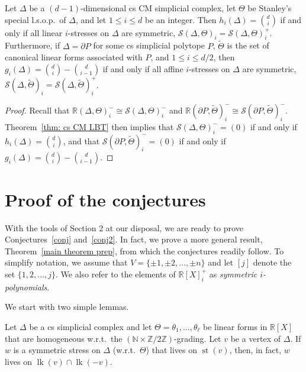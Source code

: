 \documentclass[ALCO,ThmDefs,Unicode,epreuves]{cedram}
\DeclareMathOperator{\lk}{lk}
\DeclareMathOperator{\st}{st}
\newcommand{\N}{\mathbb{N}}
\newcommand{\R}{\mathbb{R}{}}
\newcommand{\Z}{{\mathbb Z}}
\newcommand{\Stress}{\mathcal{S}}
\begin{document}
\begin{coro}\label{cor: minimal h_2 -> symmetry}
	Let $\Delta$ be a $(d-1)$-dimensional cs CM simplicial complex, let $\Theta$ be Stanley's special l.s.o.p.~of $\Delta$, and let $1\leq i\leq d$ be an integer. Then $h_{i}(\Delta)=\binom{d}{i}$ if and only if all linear $i$-stresses on $\Delta$ are symmetric, \ie $\Stress(\Delta, \Theta)_{i}=\Stress(\Delta, \Theta)^+_{i}$. Furthermore, if $\Delta=\partial P$ for some cs simplicial polytope $P$, $\widetilde{\Theta}$ is the set of canonical linear forms associated with $P$, and $1\leq i\leq d/2$, then $g_i(\Delta)=\binom{d}{i}-\binom{d}{i-1}$ if and only if all affine $i$-stresses on $\Delta$ are symmetric, \ie $\Stress(\Delta, \widetilde{\Theta})_{i}=\Stress(\Delta, \widetilde{\Theta})^+_{i}$.
\end{coro}
\begin{proof}
Recall that $\R(\Delta,\Theta)^-_i \cong \Stress(\Delta,\Theta)^-_i$ and $\R(\partial P, \widetilde{\Theta})^-_i \cong \Stress(\partial P, \widetilde{\Theta})^-_i$.	Theorem~\ref{thm: cs CM LBT} then implies that $\Stress(\Delta, \Theta)^-_i=(0)$ if and only if $h_i(\Delta)=\binom{d}{i}$, and that $\Stress(\partial P, \widetilde{\Theta})^-_i=(0)$ if and only if $g_i(\Delta)=\binom{d}{i}-\binom{d}{i-1}$.
\end{proof}




\section{Proof of the conjectures}
With the tools of Section 2 at our disposal, we are ready to prove Conjectures~\ref{conj} and~\ref{conj2}. In fact, we prove a more general result, Theorem~\ref{main theorem prep}, from which the conjectures readily follow. To simplify notation, we assume that $V=\{\pm 1,\pm 2,\ldots,\pm n\}$ and let $[j]$ denote the set $\{1,2,\ldots,j\}$. We also refer to the elements of $\R[X]^+_i$ as \emph{symmetric $i$-polynomials}.

We start with two simple lemmas.

\begin{lemma} \label{lm: support sttau}
	Let $\Delta$ be a cs simplicial complex and let $\Theta=\theta_1,\ldots,\theta_\ell$ be linear forms in $\R[X]$ that are homogeneous w.r.t.~the $(\N \times \Z/2\Z)$-grading. Let $v$ be a vertex of $\Delta$. If $w$ is a symmetric stress on $\Delta$ (w.r.t.~$\Theta$) that lives on $\st(v)$, then, in fact, $w$ lives on $\lk(v)\cap\lk(-v)$.
\end{lemma}
\end{document}
